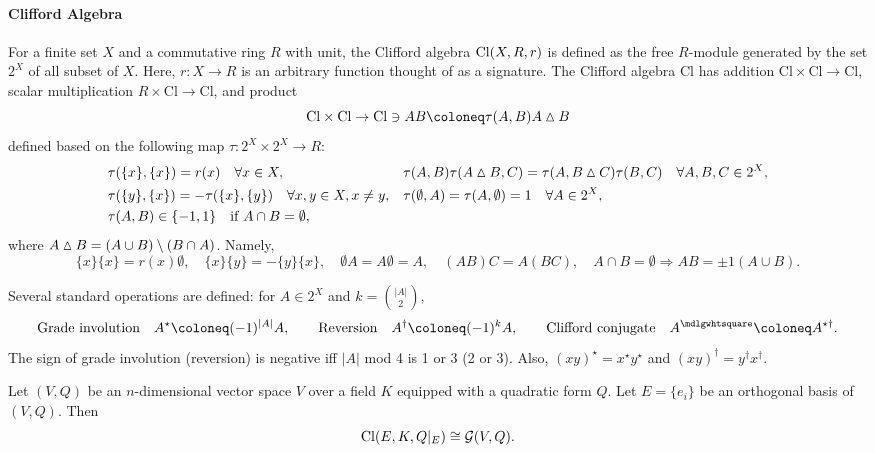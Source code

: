 \documentclass[CheatSheet]{subfiles}
\begin{document}
\paragraph{Clifford Algebra}
For a finite set $X$ and a commutative ring $R$ with unit,
the Clifford algebra $\operatorname{\mathrm{Cl}}(X,R,r)$ is defined as the free $R$-module generated by the set $2^X$ of all subset of $X$.
Here, $r\colon X\to R$ is an arbitrary function thought of as a signature.
The Clifford algebra $\mathrm{Cl}$ has
addition $\mathrm{Cl}\times\mathrm{Cl}\to\mathrm{Cl}$,
scalar multiplication $R\times\mathrm{Cl}\to\mathrm{Cl}$, and
product
\begin{equation}
  \mathrm{Cl}\times\mathrm{Cl}\to\mathrm{Cl}\ni AB
  \deq \tau(A,B)A\setdiff B
\end{equation}
defined based on the following map $\tau\colon2^X\times2^X\to R$:
\begin{equation}
  \begin{split}
  &\tau(\{x\},\{x\}) = r(x)\quad\forall x\in X,&
  &\tau(A,B)\tau(A\mathbin{\vartriangle} B,C)=\tau(A,B\mathbin{\vartriangle} C)\tau(B,C)\quad\forall A,B,C\in 2^X,\\
  &\tau(\{y\},\{x\}) = -\tau(\{x\},\{y\})\quad\forall x,y\in X,x\neq y,&
  &\tau(\emptyset,A)=\tau(A,\emptyset)=1\quad\forall A\in2^X,\\
  &\tau(A,B)\in\{-1,1\}\quad \text{if}~A\cap B=\emptyset,
  \end{split}
\end{equation}
where $A\mathbin{\vartriangle} B=(A\cup B)\setminus(B\cap A)$. Namely,
\begin{equation}
  \{x\}\{x\} = r(x)\emptyset,\quad
  \{x\}\{y\}=-\{y\}\{x\},\quad
  \emptyset A=A\emptyset=A,\quad
  (AB)C=A(BC),\quad
  A\cap B=\emptyset\Rightarrow AB=\pm1(A\cup B).
\end{equation}


Several standard operations are defined: for $A\in2^X$ and $k=\binom{|A|}{2}$,
\begin{equation}
\text{Grade involution}\quad A^\star\deq(-1)^{|A|}A,\qquad
\text{Reversion}\quad A^\dagger\deq(-1)^{k}A,\qquad
\text{Clifford conjugate}\quad A^\mdlgwhtsquare\deq A^{\star\dagger}.
\end{equation}
The sign of grade involution (reversion) is negative iff $|A|$ mod 4 is 1 or 3 (2 or 3). Also, $(xy)^\star=x^\star y^\star$ and $(xy)^\dagger=y^\dagger x^\dagger$.


Let $(V,Q)$ be an $n$-dimensional vector space $V$ over a field $K$ equipped with a quadratic form $Q$. Let $E=\{e_i\}$ be an orthogonal basis of $(V,Q)$.
Then
\begin{equation}
  \operatorname{\mathrm{Cl}}(E, K, Q|_E) \cong \operatorname{\mathcal{G}}(V,Q).
\end{equation}
\end{document}
